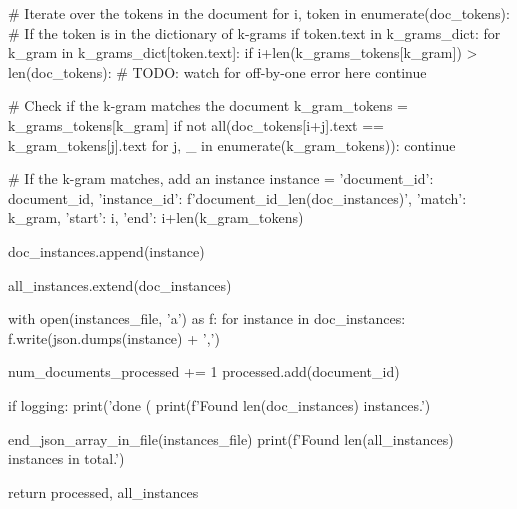 \begin{pyin}
        # Iterate over the tokens in the document
        for i, token in enumerate(doc_tokens):
            # If the token is in the dictionary of k-grams
            if token.text in k_grams_dict:
                for k_gram in k_grams_dict[token.text]:
                    if i+len(k_grams_tokens[k_gram]) > len(doc_tokens):
                        # TODO: watch for off-by-one error here
                        continue

                    # Check if the k-gram matches the document
                    k_gram_tokens = k_grams_tokens[k_gram]
                    if not all(doc_tokens[i+j].text == k_gram_tokens[j].text for j, _ in enumerate(k_gram_tokens)):
                        continue

                    # If the k-gram matches, add an instance
                    instance = {
                        'document_id': document_id,
                        'instance_id': f'{document_id}_{len(doc_instances)}',
                        'match': k_gram,
                        'start': i,
                        'end': i+len(k_gram_tokens)
                    }

                    doc_instances.append(instance)

        all_instances.extend(doc_instances)

        with open(instances_file, 'a') as f:
            for instance in doc_instances:
                f.write(json.dumps(instance) + ',\n')

        num_documents_processed += 1
        processed.add(document_id)

        if logging:
            print('done (%
            print(f'Found {len(doc_instances)} instances.')

    end_json_array_in_file(instances_file)
    print(f'Found {len(all_instances)} instances in total.')

    return processed, all_instances
\end{pyin}

